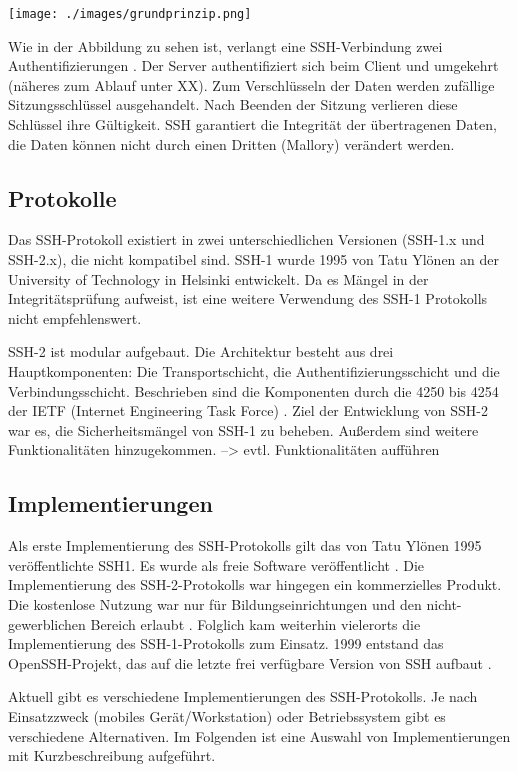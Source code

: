 \documentclass[ngerman,pdf]{wkcms}    %
\begin{document}
\texttt{[image: ./images/grundprinzip.png]}

Wie in der Abbildung zu sehen ist, verlangt eine SSH-Verbindung zwei Authentifizierungen \cite{SSH, Seite 47}. Der Server authentifiziert sich beim Client und umgekehrt (näheres zum Ablauf unter XX). Zum Verschlüsseln der Daten werden zufällige Sitzungsschlüssel ausgehandelt. Nach Beenden der Sitzung verlieren diese Schlüssel ihre Gültigkeit. SSH garantiert die Integrität der übertragenen Daten, \Dh die Daten können nicht durch einen Dritten (Mallory) verändert werden. 


\subsection{Protokolle}

Das SSH-Protokoll existiert in zwei unterschiedlichen Versionen (SSH-1.x und SSH-2.x), die nicht kompatibel sind. SSH-1 wurde 1995 von Tatu Ylönen an der University of Technology in Helsinki entwickelt. Da es Mängel in der Integritätsprüfung aufweist, ist eine weitere Verwendung des SSH-1 Protokolls nicht empfehlenswert.

SSH-2 ist modular aufgebaut. Die Architektur besteht aus drei Hauptkomponenten: Die Transportschicht, die Authentifizierungsschicht und die Verbindungsschicht. Beschrieben sind die Komponenten durch die  4250 bis 4254 der IETF (Internet Engineering Task Force) \cite{ietf}. Ziel der Entwicklung von SSH-2 war es, die Sicherheitsmängel von SSH-1 zu beheben. Außerdem sind weitere Funktionalitäten hinzugekommen. --> evtl. Funktionalitäten aufführen


\subsection{Implementierungen}

Als erste Implementierung des SSH-Protokolls gilt das von Tatu Ylönen 1995 veröffentlichte SSH1.
Es wurde als freie Software veröffentlicht \cite{SSH, S.11}. Die Implementierung des SSH-2-Protokolls war hingegen ein kommerzielles Produkt. Die kostenlose Nutzung war nur für Bildungseinrichtungen und den nicht-gewerblichen Bereich erlaubt \cite{SSH, S.12}. Folglich kam weiterhin vielerorts die Implementierung des SSH-1-Protokolls zum Einsatz. 1999 entstand das OpenSSH-Projekt, das auf die letzte frei verfügbare Version von SSH aufbaut \cite{OpenSSH}.

Aktuell gibt es verschiedene Implementierungen des SSH-Protokolls. Je nach Einsatzzweck (mobiles Gerät/Workstation) oder Betriebssystem gibt es verschiedene Alternativen. Im Folgenden ist eine Auswahl von Implementierungen mit Kurzbeschreibung aufgeführt.
\end{document}
